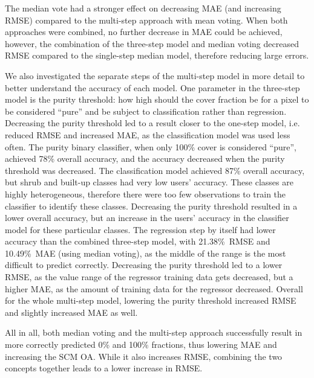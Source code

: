 \documentclass[review,authoryear,3p]{elsarticle}
\begin{document}
The median vote had a stronger effect on decreasing \gls{MAE} (and increasing \gls{RMSE}) compared to the multi-step approach with mean voting.
When both approaches were combined, no further decrease in \gls{MAE} could be achieved, however, the combination of the three-step model and median voting decreased \gls{RMSE} compared to the single-step median model, therefore reducing large errors.

We also investigated the separate steps of the multi-step model in more detail to better understand the accuracy of each model.
One parameter in the three-step model is the purity threshold: how high should the cover fraction be for a pixel to be considered ``pure'' and be subject to classification rather than regression.
Decreasing the purity threshold led to a result closer to the one-step model, i.e. reduced \gls{RMSE} and increased \gls{MAE}, as the classification model was used less often.
The purity binary classifier, when only 100\% cover is considered ``pure'', achieved 78\% overall accuracy, and the accuracy decreased when the purity threshold was decreased.
The classification model achieved 87\% overall accuracy, but shrub and built-up classes had very low users' accuracy.
These classes are highly heterogeneous, therefore there were too few observations to train the classifier to identify these classes.
Decreasing the purity threshold resulted in a lower overall accuracy, but an increase in the users' accuracy in the classifier model for these particular classes.
The regression step by itself had lower accuracy than the combined three-step model, with 21.38\%~\gls{RMSE} and 10.49\%~\gls{MAE} (using median voting), as the middle of the range is the most difficult to predict correctly.
Decreasing the purity threshold led to a lower \gls{RMSE}, as the value range of the regressor training data gets decreased, but a higher \gls{MAE}, as the amount of training data for the regressor decreased.
Overall for the whole multi-step model, lowering the purity threshold increased \gls{RMSE} and slightly increased \gls{MAE} as well.

All in all, both median voting and the multi-step approach successfully result in more correctly predicted 0\% and 100\% fractions, thus lowering \gls{MAE} and increasing the \gls{SCM} \gls{OA}.
While it also increases \gls{RMSE}, combining the two concepts together leads to a lower increase in \gls{RMSE}.
\end{document}
